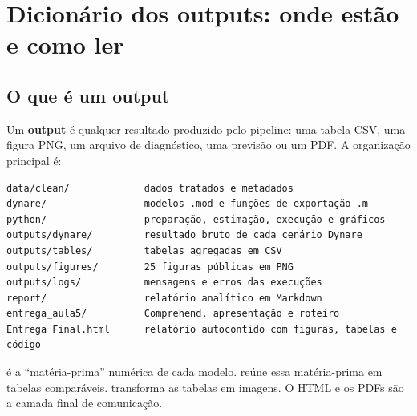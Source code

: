 \documentclass[11pt,a4paper]{article}
\begin{document}
\normalsize

\section{Dicionário dos outputs: onde estão e como ler}

\subsection{O que é um output}
Um \textbf{output} é qualquer resultado produzido pelo pipeline: uma tabela CSV, uma figura PNG, um
arquivo de diagnóstico, uma previsão ou um PDF. A organização principal é:

\begin{Verbatim}[fontsize=\small]
data/clean/             dados tratados e metadados
dynare/                 modelos .mod e funções de exportação .m
python/                 preparação, estimação, execução e gráficos
outputs/dynare/         resultado bruto de cada cenário Dynare
outputs/tables/         tabelas agregadas em CSV
outputs/figures/        25 figuras públicas em PNG
outputs/logs/           mensagens e erros das execuções
report/                 relatório analítico em Markdown
entrega_aula5/          Comprehend, apresentação e roteiro
Entrega Final.html      relatório autocontido com figuras, tabelas e código
\end{Verbatim}

\begin{intuicao}
 é a ``matéria-prima'' numérica de cada modelo.
 reúne essa matéria-prima em tabelas comparáveis.
 transforma as tabelas em imagens. O HTML e os PDFs são a camada final de
comunicação.
\end{intuicao}
\end{document}

